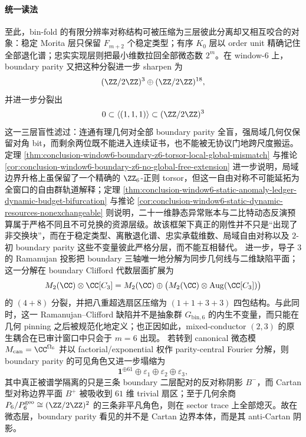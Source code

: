 



\paragraph{统一读法}
至此，bin-fold 的有限分辨率对称结构可被压缩为三层彼此分离却又相互咬合的对象：稳定 Morita 层只保留 \(F_{m+2}\) 个稳定类型；有序 \(K_0\) 层以 order unit 精确记住全部退化谱；忠实实现层则把最小维数拉回全部微态数 \(2^m\)。在 window-\(6\) 上，boundary parity 又把这种分裂进一步 sharpen 为
\[
(\ZZ/2\ZZ)^3\oplus (\ZZ/2\ZZ)^{18},
\]
并进一步分裂出
\[
0\subset \langle(1,1,1)\rangle\subset (\ZZ/2\ZZ)^3
\]
这一三层盲性滤过：连通有理几何对全部 boundary parity 全盲，强局域几何仅保留对角 bit，而剩余两位既不能进入连续证书，也不能被无协议门地跨尺度搬运。定理 \ref{thm:conclusion-window6-boundary-z6-torsor-local-global-mismatch} 与推论 \ref{cor:conclusion-window6-boundary-z6-no-global-free-extension} 进一步说明，局域边界升格上虽保留了一个精确的 \(\ZZ_6\)-正则 torsor，但这一自由对称不可能延拓为全窗口的自由群轨道解释；定理 \ref{thm:conclusion-window6-static-anomaly-ledger-dynamic-budget-bifurcation} 与推论 \ref{cor:conclusion-window6-static-dynamic-resources-nonexchangeable} 则说明，二十一维静态异常账本与二比特动态反演预算属于严格不同且不可兑换的资源层级。故该框架下真正的刚性并不只是“出现了非交换块”，而在于稳定类型、离散退化谱、忠实承载维数、局域自由对称以及 \(2\)-初 boundary parity 这些不变量彼此严格分层，而不能互相替代。
进一步，导子 \(3\) 的 Ramanujan 投影把 boundary 三轴唯一地分解为同步几何线与二维缺陷平面；这一分解在 boundary Clifford 代数层面扩展为
\[
M_2(\CC)\otimes \CC[C_3]
=
M_2(\CC)\oplus \bigl(M_2(\CC)\otimes \mathrm{Aug}(\CC[C_3])\bigr)
\]
的 \((4+8)\) 分裂，并把八重超选扇区压缩为 \((1+1+3+3)\) 四包结构。与此同时，这一 Ramanujan--Clifford 缺陷并不是抽象群 \(G_{\mathrm{bin},6}\) 的内生不变量，而只能在几何 pinning 之后被规范化地定义；也正因如此，mixed-conductor \((2,3)\) 的原生耦合在已审计窗口中只会于 \(m=6\) 出现。
若转到 canonical 微态模 \(M_{\mathrm{can}}=\CC^{\Omega_6}\) 并以 factorial/exponential 权作 parity-central Fourier 分解，则 boundary parity 的可见角色又进一步塌缩为
\[
\mathbf 1^{\oplus 61}\oplus \varepsilon_1\oplus \varepsilon_2\oplus \varepsilon_3,
\]
其中真正被谱学隔离的只是三条 boundary 二层配对的反对称阴影 \(B^-\)，而 Cartan 型对称边界平面 \(B^+\) 被吸收到 \(61\) 维 trivial 扇区；至于几何余商 \(P_6/P_6^{\mathrm{geo}}\cong (\ZZ/2\ZZ)^2\) 的三条非平凡角色，则在 sector trace 上全部熄灭。故在微态层，boundary parity 看见的并不是 Cartan 边界本体，而是其 anti-Cartan 阴影。
